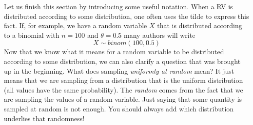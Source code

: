 \documentclass[a4paper,11pt,leqno]{report}
\begin{document}
Let us finish this section by introducing some useful notation. When a RV is distributed according to some distribution, one often uses
the tilde to express this fact. If, for example, we have a random variable $ X $ that is distributed according to a binomial with $ n=100 $
and $ \theta = 0.5 $ many authors will write
$$ X \sim binom(100, 0.5) $$
Now that we know what it means for a random variable to be distributed according to some distribution, we can also clarify a question 
that was brought up in the beginning. What does sampling \textit{uniformly at random} mean? It just means that we are sampling from
a distribution that is the uniform distribution (all values have the same probability). The \textit{random} comes from the fact that
we are sampling the values of a random variable. Just saying that some quantity is sampled at random is not enough. You should
always add which distribution underlies that randomness!
\end{document}
